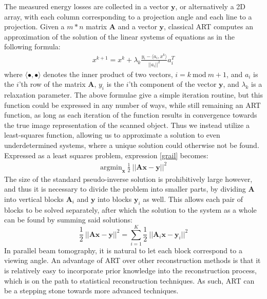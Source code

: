 The measured energy losses are collected in a vector $\mathbf{y}$, or alternatively a 2D array, with each column corresponding to a projection angle and each line to a projection. Given a $m*n$ matrix $\mathbf{A}$ and a vector $\mathbf{y}$, classical ART computes an approximation of the solution of the linear systems of equations as in the following formula:
\begin{align}
    x^{k+1}=x^k+\lambda_k \frac{y_i-\langle a_i,x^k \rangle}{||a_i||^2}a_i^T
\end{align}
where $\langle \bullet , \bullet \rangle$ denotes the inner product of two vectors, $i=k~\text{mod}~m+1$, and $a_i$ is the $i$'th row of the matrix $\mathbf{A}$, $y_i$ is the $i$'th component of the vector $\mathbf{y}$, and $\lambda_k$ is a relaxation parameter. 
The above formulae give a simple iteration routine, but this function could be expressed in any number of ways, while still remaining an ART function, as long as each iteration of the function results in convergence towards the true image representation of the scanned object\cite[p.~194]{FCT}. 
Thus we instead utilize a least-squares function, allowing us to approximate a solution to even underdetermined systems, where a unique solution could otherwise not be found\cite{BLOCK}.
Expressed as a least squares problem, expression \ref{grail} becomes:
\begin{align}
    \text{argmin}_{\mathbf{x}}~\frac{1}{2} ~ || \mathbf{Ax} - \mathbf{y} ||^{2}
\end{align}
The size of the standard pseudo-inverse solution is prohibitively large however, and thus it is necessary to divide the problem into smaller parts, by dividing $\mathbf{A}$ into vertical blocks $\mathbf{A}_i$ and $\mathbf{y}$ into blocks $\mathbf{y}_i$ as well.
This allows each pair of blocks to be solved separately, after which the solution to the system as a whole can be found by summing said solutions:
\begin{equation}\label{eq:leastsqaures}
    \frac{1}{2} ~ || \mathbf{Ax} - \mathbf{y} ||^{2} = \sum_{i=1}^K \frac{1}{2} ~ || \mathbf{A}_i\mathbf{x} - \mathbf{y}_i ||^{2}
\end{equation}
In parallel beam tomography, it is natural to let each block correspond to a viewing angle. An advantage of ART over other reconstruction methods is that it is relatively easy to incorporate prior knowledge into the reconstruction process, which is on the path to statistical reconstruction techniques. As such, ART can be a stepping stone towards more advanced techniques.


